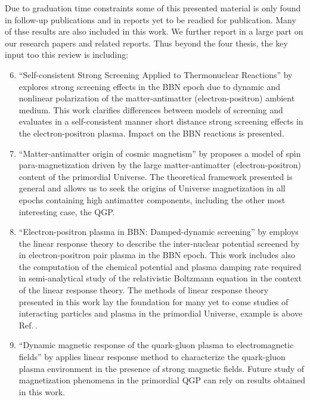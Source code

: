 Due to graduation time constraints some of this presented material is only found in follow-up publications and in reports yet to be readied for publication. Many of thse results are also included in this work. We further report in a large part on our research papers and related reports. Thus beyond the four thesis, the key input too this review is including:
\begin{enumerate}
\setcounter{enumi}{5}
\item {\small ``Self-consistent Strong Screening Applied to Thermonuclear Reactions''} by  explores strong screening effects in the BBN epoch due to dynamic and nonlinear polarization of the matter-antimatter (electron-positron) ambient medium. {\color{blue} This work clarifies differences between models of screening and evaluates in a self-consistent manner short distance strong screening effects in the electron-positron plasma. Impact on the BBN reactions is presented.}
%
\item ``Matter-antimatter origin of cosmic magnetism'' by  proposes a model of spin para-magnetization driven by the large matter-antimatter (electron-positron) content of the primordial Universe. {\color{blue} The theoretical framework presented is general and allows us to seek the origins of Universe magnetization in all epochs containing high antimatter components, including the other most interesting case, the QGP.}
%
\item ``Electron-positron plasma in BBN: Damped-dynamic screening'' by  employs the linear response theory to describe the inter-nuclear potential screened by in electron-positron pair plasma in the BBN epoch. This work includes also the computation of the chemical potential and plasma damping rate required in semi-analytical study of the relativistic Boltzmann equation in the context of the linear response theory. {\color{blue} The methods of linear response theory presented in this work lay the foundation for many yet to come studies of interacting particles and plasma in the primordial Universe, example is above Ref.\,\cite{Grayson:2024uwg}.}
%
\item ``Dynamic magnetic response of the quark-gluon plasma to electromagnetic fields'' by  applies linear response method to characterize the quark-gluon plasma environment in the presence of strong magnetic fields. {\color{blue} Future study of magnetization phenomena in the primordial QGP can rely on results obtained in this work.}

\end{enumerate}
